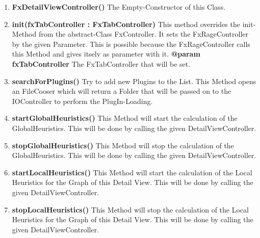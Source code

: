 \documentclass{article}
\begin{document}
				\begin{enumerate}[+]
					\item{
						\textbf{FxDetailViewController()} \newline
						The Empty-Constructor of this Class.
						\newline
					}
					\item{
						\textbf{init(fxTabController : FxTabController)} \newline
						This method overrides the init-Method from the abstract-Class FxController.
						It sets the FxRageController by the given Parameter.
						This is possible because the FxRageController calls this Method and gives itselv as parameter with it.
						\newline
						\textbf{@param fxTabController}
						The FxTabController that will be set.
						\newline
					}
					\item{
						\textbf{searchForPlugins()} \newline
						Try to add new Plugins to the List.
						This Method opens an FileCooser which will return a Folder that will be passed on to the IOController to perform the PlugIn-Loading.
						\newline
					}
					\item{
						\textbf{startGlobalHeuristics()} \newline
						This Method will start the calculation of the GlobalHeuristics.
						This will be done by calling the given DetailViewController.
						\newline
					}
					\item{
						\textbf{stopGlobalHeuristics()} \newline
						This Method will stop the calculation of the GlobalHeuristics.
						This will be done by calling the given DetailViewController.
						\newline
					}
					\item{
						\textbf{startLocalHeuristics()} \newline
						This Method will start the calculation of the Local Heuristics for the Graph of this Detail View.
						This will be done by calling the given DetailViewController.
						\newline
					}
					\item{
						\textbf{stopLocalHeuristics()} \newline
						This Method will stop the calculation of the Local Heuristics for the Graph of this Detail View.
						This will be done by calling the given DetailViewController.
}
\end{enumerate}
\end{document}
